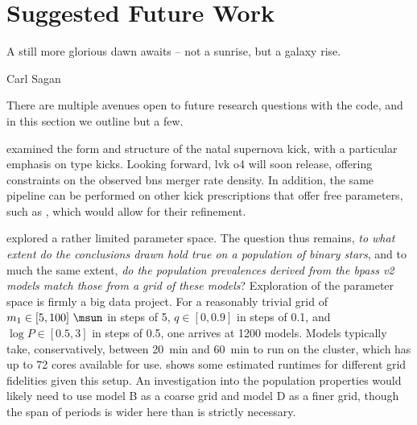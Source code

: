 \section{Suggested Future Work}

\epigraph{A still more glorious dawn awaits -- not a sunrise, but a galaxy rise.}{Carl Sagan}

\alice

There are multiple avenues open to future research questions with the  code, and in this section we outline but a few.

 examined the form and structure of the natal supernova kick, with a particular emphasis on \citet{Bray:2016} type kicks. Looking forward, \gls{lvk} \gls{o4} will soon release, offering constraints on the observed \gls{bns} merger rate density. In addition, the same pipeline can be performed on other kick prescriptions that offer free parameters, such as \citet{Verbunt:2017}, which would allow for their refinement.

 explored a rather limited parameter space. The question thus remains, \textit{to what extent do the conclusions drawn hold true on a population of binary stars}, and to much the same extent, \textit{do the population prevalences derived from the \gls{bpass} v2 models match those from a grid of these models}? Exploration of the parameter space is firmly a big data project. For a reasonably trivial grid of $m_1 \in [5, 100]~\unit{\msun}$ in steps of \SI{5}{\msun}, $q\in [0, 0.9]$ in steps of 0.1, and $\log P\in[0.5, 3]$ in steps of \SI{0.5}{\dex}, one arrives at 1200 models. Models typically take, conservatively, between \SI{20}{\minute} and \SI{60}{\minute} to run on the cluster, which has up to 72 cores available for use.  shows some estimated runtimes for different grid fidelities given this setup. An investigation into the population properties would likely need to use model B as a coarse grid and model D as a finer grid, though the span of periods is wider here than is strictly necessary.

